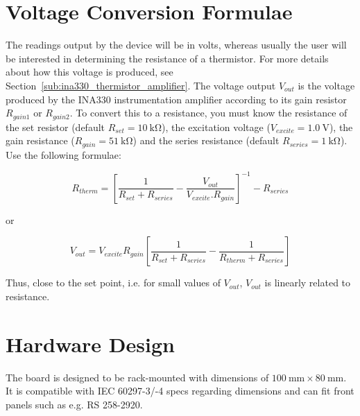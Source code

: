 \documentclass[11pt]{report}
\newcommand{\VExcite}{1.0}
\newcommand{\RGain}{\SI{51}{\kilo\ohm}}
\newcommand{\RSeries}{\SI{1}{\kilo\ohm}}
\newcommand{\RSet}{\SI{10}{\kilo\ohm}}
\begin{document}


\chapter{Voltage Conversion Formulae} %
\label{sec:voltage_conversion_formulae}

The readings output by the device will be in volts, whereas usually the user will be interested in determining the resistance of a thermistor. For more details about how this voltage is produced, see Section~\ref{sub:ina330_thermistor_amplifier}. The voltage output $V_{out}$ is the voltage produced by the INA330 instrumentation amplifier according to its gain resistor $R_{gain1}$ or $R_{gain2}$. To convert this to a resistance, you must know the resistance of the set resistor (default $R_{set} = \RSet$), the excitation voltage ($V_{excite} = \SI{\VExcite}{\volt}$), the gain resistance ($R_{gain} = \RGain$) and the series resistance (default $R_{series} = \RSeries$). Use the following formulae:

\begin{equation}
\label{eq:volt_to_resistance}
R_{therm} = \left[ \frac{1}{R_{set} + R_{series}} - 
	\frac{V_{out}}{V_{excite} . R_{gain}} \right] ^ {-1}
	- R_{series}
\end{equation} 

or

\begin{equation}
\label{eq:resistance_to_voltage}
V_{out} = V_{excite} R_{gain} \left[ \frac{1}{R_{set} + R_{series}} - \frac{1}{R_{therm} + R_{series}} \right]
\end{equation} 

Thus, close to the set point, i.e. for small values of $V_{out}$, $V_{out}$ is linearly related to resistance. 


\chapter{Hardware Design} %
\label{sec:hardware_design}

The board is designed to be rack-mounted with dimensions of $\SI{100}{\mm} \times \SI{80}{\mm}$. It is compatible with IEC 60297-3/-4 specs regarding dimensions and can fit front panels such as e.g. RS 258-2920. 

\end{document}
